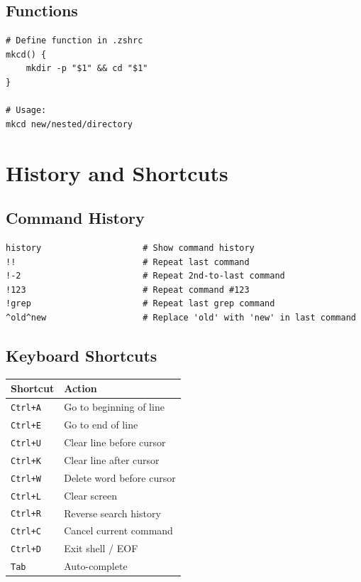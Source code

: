 \documentclass[11pt]{article}
\begin{document}
\subsection{Functions}

\begin{lstlisting}
# Define function in .zshrc
mkcd() {
    mkdir -p "$1" && cd "$1"
}

# Usage:
mkcd new/nested/directory
\end{lstlisting}

\section{History and Shortcuts}

\subsection{Command History}

\begin{lstlisting}
history                    # Show command history
!!                         # Repeat last command
!-2                        # Repeat 2nd-to-last command
!123                       # Repeat command #123
!grep                      # Repeat last grep command
^old^new                   # Replace 'old' with 'new' in last command
\end{lstlisting}

\subsection{Keyboard Shortcuts}

\begin{center}
\begin{tabular}{ll}
\toprule
Shortcut & Action \\
\midrule
\texttt{Ctrl+A} & Go to beginning of line \\
\texttt{Ctrl+E} & Go to end of line \\
\texttt{Ctrl+U} & Clear line before cursor \\
\texttt{Ctrl+K} & Clear line after cursor \\
\texttt{Ctrl+W} & Delete word before cursor \\
\texttt{Ctrl+L} & Clear screen \\
\texttt{Ctrl+R} & Reverse search history \\
\texttt{Ctrl+C} & Cancel current command \\
\texttt{Ctrl+D} & Exit shell / EOF \\
\texttt{Tab} & Auto-complete \\
\bottomrule
\end{tabular}
\end{center}
\end{document}
